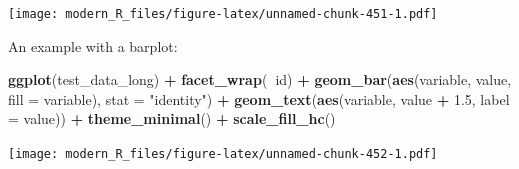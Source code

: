 \documentclass[]{gitbook}
\newenvironment{Shaded}{\begin{snugshade}}{\end{snugshade}}
\newcommand{\DataTypeTok}[1]{\textcolor[rgb]{0.13,0.29,0.53}{#1}}
\newcommand{\FloatTok}[1]{\textcolor[rgb]{0.00,0.00,0.81}{#1}}
\newcommand{\KeywordTok}[1]{\textcolor[rgb]{0.13,0.29,0.53}{\textbf{#1}}}
\newcommand{\NormalTok}[1]{#1}
\newcommand{\OperatorTok}[1]{\textcolor[rgb]{0.81,0.36,0.00}{\textbf{#1}}}
\newcommand{\StringTok}[1]{\textcolor[rgb]{0.31,0.60,0.02}{#1}}
\begin{document}
\begin{Shaded}
\end{Shaded}

\texttt{[image: modern\_R\_files/figure-latex/unnamed-chunk-451-1.pdf]}

An example with a barplot:

\begin{Shaded}
\begin{Highlighting}[]
\KeywordTok{ggplot}\NormalTok{(test_data_long) }\OperatorTok{+}
\StringTok{  }\KeywordTok{facet_wrap}\NormalTok{(}\OperatorTok{~}\NormalTok{id) }\OperatorTok{+}
\StringTok{  }\KeywordTok{geom_bar}\NormalTok{(}\KeywordTok{aes}\NormalTok{(variable, value, }\DataTypeTok{fill =}\NormalTok{ variable), }\DataTypeTok{stat =} \StringTok{"identity"}\NormalTok{) }\OperatorTok{+}
\StringTok{  }\KeywordTok{geom_text}\NormalTok{(}\KeywordTok{aes}\NormalTok{(variable, value }\OperatorTok{+}\StringTok{ }\FloatTok{1.5}\NormalTok{, }\DataTypeTok{label =}\NormalTok{ value)) }\OperatorTok{+}
\StringTok{  }\KeywordTok{theme_minimal}\NormalTok{() }\OperatorTok{+}
\StringTok{  }\KeywordTok{scale_fill_hc}\NormalTok{()}
\end{Highlighting}
\end{Shaded}

\texttt{[image: modern\_R\_files/figure-latex/unnamed-chunk-452-1.pdf]}
\end{document}
